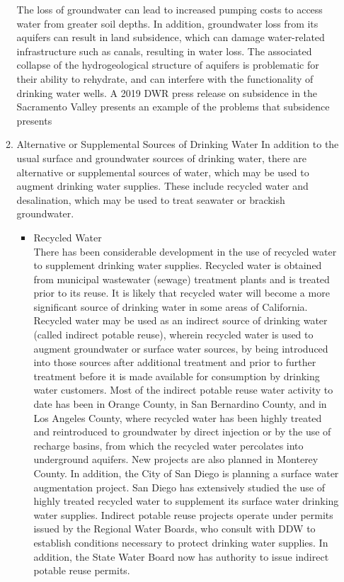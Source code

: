 \begin{itemize}
\begin{enumerate}
The loss of groundwater can lead to increased pumping costs to access water from greater soil depths. In addition, groundwater loss from its aquifers can result in land subsidence, which can damage water-related infrastructure such as canals, resulting in water loss. The associated collapse of the hydrogeological structure of aquifers is problematic for their ability to rehydrate, and can interfere with the functionality of drinking water wells. A 2019 DWR press release on subsidence in the Sacramento Valley presents an example of the problems that subsidence presents
\item Alternative or Supplemental Sources of Drinking Water
In addition to the usual surface and groundwater sources of drinking water, there are alternative or supplemental sources of water, which may be used to augment drinking water supplies. These include recycled water and desalination, which may be used to treat seawater or brackish groundwater.
\begin{itemize}
\item Recycled Water\\
There has been considerable development in the use of recycled water to supplement drinking water supplies. Recycled water is obtained from municipal wastewater (sewage)
treatment plants and is treated prior to its reuse. It is likely that recycled water will become a more significant source of drinking water in some areas of California.
Recycled water may be used as an indirect source of drinking water (called indirect potable reuse), wherein recycled water is used to augment groundwater or surface water sources, by being introduced into those sources after additional treatment and prior to further treatment before it is made available for consumption by drinking water customers.
Most of the indirect potable reuse water activity to date has been in Orange County, in San Bernardino County, and in Los Angeles County, where recycled water has been highly treated and reintroduced to groundwater by direct injection or by the use of recharge basins, from which the recycled water percolates into underground aquifers. New projects are also planned in Monterey County. In addition, the City of San Diego is planning a surface water augmentation project. San Diego has extensively studied the use of highly treated recycled water to supplement its surface water drinking water supplies.
Indirect potable reuse projects operate under permits issued by the Regional Water Boards, who consult with DDW to establish conditions necessary to protect drinking water supplies. In addition, the State Water Board now has authority to issue indirect potable reuse permits.

\end{itemize}
\end{enumerate}
\end{itemize}
